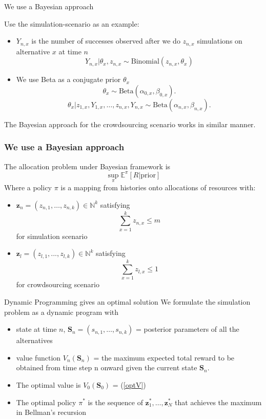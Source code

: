 \documentclass{beamer}
\newcommand{\Sv}{\mathbf{S}}
\newcommand{\zv}{\mathbf{z}}
\begin{document}
\begin{frame}{We use a Bayesian approach}

Use the simulation-scenario as an example:
\begin{itemize}
\item $Y_{n,x}$ is the number of successes observed after we do $z_{n,x}$ simulations on alternative $x$ at time $n$
\[Y_{n,x}|\theta_x,z_{n,x}\sim \mathrm{Binomial}(z_{n,x},\theta_x)\]
\item We use Beta as a conjugate prior 
$\theta_x$ \[\theta_x \sim \mathrm{Beta}(\alpha_{0,x},\beta_{0,x}).\]
\begin{equation*}
  \theta_x | z_{1,x}, Y_{1,x}, \ldots, z_{n,x}, Y_{n,x} 
  \sim \mathrm{Beta}(\alpha_{n,x},\beta_{n,x}).
\end{equation*}
\end{itemize}
The Bayesian approach for the crowdsourcing scenario works in similar manner.
\end{frame}

\begin{frame}
\frametitle{We use a Bayesian approach}
The allocation problem under Bayesian framework is 
\begin{equation}\label{optV}
\sup_{\pi} \mathbb{E}^{\pi} \left[R\Big|\text{prior}\right]
\end{equation}
Where a policy $\pi$ is a mapping from histories onto allocations of resources with:
\begin{itemize}
\item  $\zv_n = (z_{n,1},\ldots,z_{n,k})\in \mathbb{N}^k$ satisfying \[\sum_{x=1}^k z_{n,x}\leq m\] for simulation scenario
\item $\zv_l = (z_{l,1},...,z_{l,k}) \in \mathbb{N}^k$ satisfying \[\sum_{x=1}^k z_{l,x}\leq 1\] for crowdsourcing scenario
\end{itemize}
\end{frame}

\begin{frame}{Dynamic Programming gives an optimal solution}
We formulate the simulation problem as a dynamic program with
\begin{itemize}
\item state at time $n$, $\Sv_n = (s_{n,1},\ldots,s_{n,k})$ = posterior parameters of all the alternatives
\item value function $V_n(\Sv_n)$ = the maximum expected total reward to be obtained from time step n onward given the current state $\Sv_n$.
\item The optimal value is $V_0(\mathbf{S}_0)$ = (\ref{optV})
\item The optimal policy $\pi^*$ is the sequence of $\zv_1^*,\ldots,\zv_N^*$ that achieves the maximum in Bellman's recursion
\end{itemize}
\end{frame}
\end{document}
